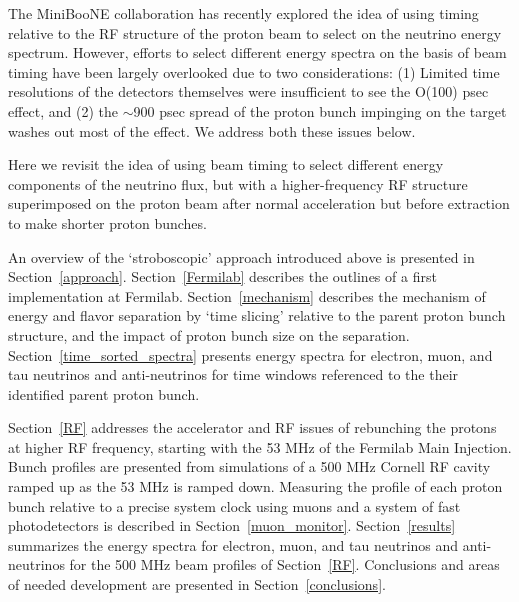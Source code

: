 The MiniBooNE collaboration has recently explored the idea of using
timing relative to the RF structure of the proton beam 
to select on the neutrino energy spectrum. However, efforts to
select different energy spectra on the basis of beam timing have been
largely overlooked due to two considerations: (1) Limited time
resolutions of the detectors themselves were insufficient to see the
O(100) psec effect, and (2) the $\sim$900 psec spread of the proton
bunch impinging on the target washes out most of the effect. We
address both these issues below.

Here we revisit the idea of using beam timing to select different
energy components of the neutrino flux, but with a higher-frequency RF
structure superimposed on the proton beam after normal acceleration
but before extraction to make shorter proton bunches.

An overview of the `stroboscopic' approach introduced above is
presented in Section~\ref{approach}. Section~\ref{Fermilab} describes
the outlines of a first implementation at Fermilab.
Section~\ref{mechanism} describes the mechanism of energy and flavor
separation by `time slicing' relative to the parent proton bunch
structure, and the impact of proton bunch size on the separation.
Section~\ref{time_sorted_spectra} presents energy spectra for
electron, muon, and tau neutrinos and anti-neutrinos for time windows
referenced to the their identified parent proton bunch.

Section~\ref{RF} addresses the accelerator and RF issues of rebunching
the protons at higher RF frequency, starting with the 53 MHz of the
Fermilab Main Injection. Bunch profiles are presented from simulations
of a 500 MHz Cornell RF cavity ramped up as the 53 MHz is ramped
down. Measuring the profile of each proton bunch relative to a precise
system clock using muons and a system of fast photodetectors is
described in Section~\ref{muon_monitor}.  Section~\ref{results}
summarizes the energy spectra for electron, muon, and tau neutrinos
and anti-neutrinos for the 500 MHz beam profiles of
Section~\ref{RF}. Conclusions and areas of needed development are
presented in Section~\ref{conclusions}.

